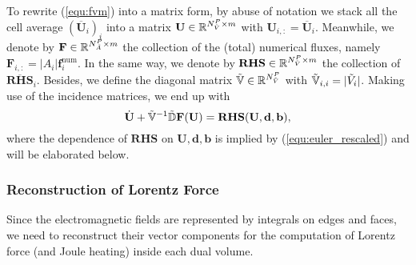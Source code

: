 \documentclass{article}
\begin{document}
To rewrite (\ref{equ:fvm}) into a matrix form, by abuse of notation we stack all the cell average $(\overline{\mathbf{U}}_i)_i$ into a matrix $\mathbf{U} \in \mathbb{R}^{N_{\Tilde{V}}^P \times m}$ with $\mathbf{U}_{i,:} = \overline{\mathbf{U}}_i$. Meanwhile, we denote by $\mathbf{F} \in \mathbb{R}^{N_{\Tilde{A}}^P \times m}$ the collection of the (total) numerical fluxes, namely $\mathbf{F}_{i,:} = |A_i|\mathbf{f}^\text{num}_i$. In the same way, we denote by $\mathbf{RHS}\in \mathbb{R}^{N_{\Tilde{V}}^P \times m}$ the collection of $\overline{\mathbf{RHS}}_i$. Besides, we define the diagonal matrix $\mathbb{\Tilde{V}} \in \mathbb{R}^{N_{\Tilde{V}}^P}$ with $\mathbb{\Tilde{V}}_{i,i} = |\Tilde{V}_i|$. Making use of the incidence matrices, we end up with
\begin{equation*}
    \dot{\mathbf{U}} + \mathbb{\Tilde{V}}^{-1}\mathbb{\Tilde{D}}\mathbf{F}(\mathbf{U})  = \mathbf{RHS}(\mathbf{U},\mathbf{d},\mathbf{b}),
\end{equation*}
where the dependence of $\mathbf{RHS}$ on $\mathbf{U}, \mathbf{d}, \mathbf{b}$ is implied by (\ref{equ:euler_rescaled}) and will be elaborated below.

\subsubsection{Reconstruction of Lorentz Force}
Since the electromagnetic fields are represented by integrals on edges and faces, we need to reconstruct their vector components for the computation of Lorentz force (and Joule heating) inside each dual volume.    
\end{document}
